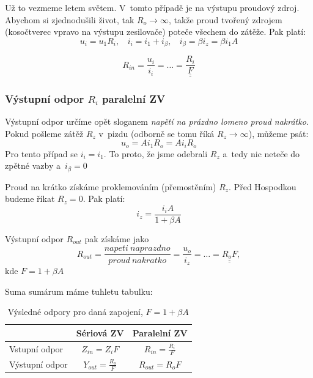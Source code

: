\documentclass[a4paper,12pt]{article}   %
\begin{document}
Už to vezmeme letem světem. V~tomto případě je na výstupu proudový zdroj. Abychom si zjednodušili život, tak $R_o \rightarrow \infty$, takže proud tvořený zdrojem (kosočtverec vpravo na výstupu zesilovače) poteče všechem do zátěže. Pak platí: 
\begin{equation}
    u_i = u_\text{1} R_i,~~~~i_i=i_\text{1} + i_\beta,~~~~ i_\beta = \beta i_z = \beta i_1 A
\end{equation}

\begin{equation}
    R_{in} = \frac{u_i}{i_i} = \dots = \underline{\underline{\frac{R_i}{F}}}
\end{equation}

\subsubsection*{Výstupní odpor $R_i$ paralelní ZV}
Výstupní odpor určíme opět sloganem \textit{napětí na prázdno lomeno proud nakrátko}.
Pokud pošleme zátěž $R_z$ v~pizdu (odborně se tomu říká $R_z \rightarrow \infty$), můžeme psát:
\begin{equation*}
    u_o = Ai_\text{1}R_o = Ai_iR_o
\end{equation*}
Pro tento případ se $i_i = i_\text{1}$. To proto, že jsme odebrali $R_z$ a~tedy nic neteče do zpětné vazby a~$i_\beta = 0$

Proud na krátko získáme proklemováním (přemostěním) $R_z$. Před Hospodkou budeme říkat $R_z = 0$. Pak platí:
\begin{equation*}
    i_z = \frac{i_i A}{1+\beta A}
\end{equation*}

Výstupní odpor $R_{out}$ pak získáme jako
\begin{equation}
    R_{out} = \frac{napeti~naprazdno}{proud~nakratko} = \frac{u_o}{i_z} = \dots = \underline{\underline{R_o F}},
\end{equation}
kde $F=1+\beta A$

Suma sumárum máme tuhletu tabulku:
\begin{table}[h!]
    \centering
    \begin{tabular}{|l|c|c|}
        \hline
        & Sériová ZV & Paralelní ZV\\\hline\hline
        \rule{0pt}{2.5ex}Vstupní odpor & $Z_{in} = Z_i F$ & $R_{in} = \frac{R_i}{F}$\\[.7ex]\hline
        \rule{0pt}{2.5ex}Výstupní odpor & $Y_{out} = \frac{R_o}{F}$ & $R_{out} = R_o F$\\[.7ex]\hline
    \end{tabular}        
    \caption{Výsledné odpory pro daná zapojení, $F=1+\beta A$}
\end{table}%
\end{document}
